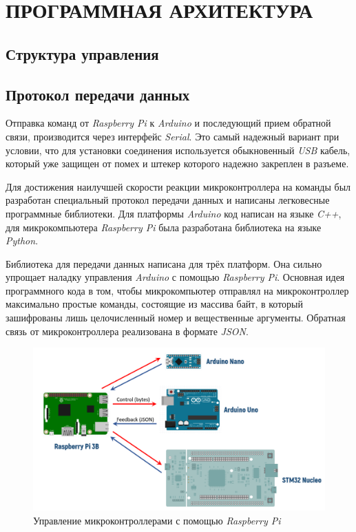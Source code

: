 \chapter{\MakeUppercase{Программная архитектура}}
\section{Структура управления}

\section{Протокол передачи данных} \label{sec:protocol}
Отправка команд от \textit{Raspberry Pi} к \textit{Arduino} и последующий прием обратной связи, производится через интерфейс \textit{Serial}. Это самый надежный вариант при условии, что для установки соединения используется обыкновенный \textit{USB} кабель, который уже защищен от помех и штекер которого надежно закреплен в разъеме.

Для достижения наилучшей скорости реакции микроконтроллера на команды был разработан специальный протокол передачи данных и написаны легковесные программные библиотеки. Для платформы \textit{Arduino} код написан на языке \textit{C++}, для микрокомпьютера \textit{Raspberry Pi} была разработана библиотека на языке \textit{Python}.

\noindent Библиотека для передачи данных написана для трёх платформ. Она сильно упрощает наладку управления \textit{Arduino} с помощью \textit{Raspberry Pi}. Основная идея программного кода в том, чтобы микрокомпьютер отправлял на микроконтроллер максимально простые команды, состоящие из массива байт, в который зашифрованы лишь целочисленный номер и вещественные аргументы. Обратная связь от микроконтроллера реализована в формате \textit{JSON}.

\begin{figure}[h]
    \centering
    \includegraphics[scale=0.6]{chapter_arch/figure1.png}
    \caption{Управление микроконтроллерами с помощью \textit{Raspberry Pi}}
    \label{}
\end{figure}

